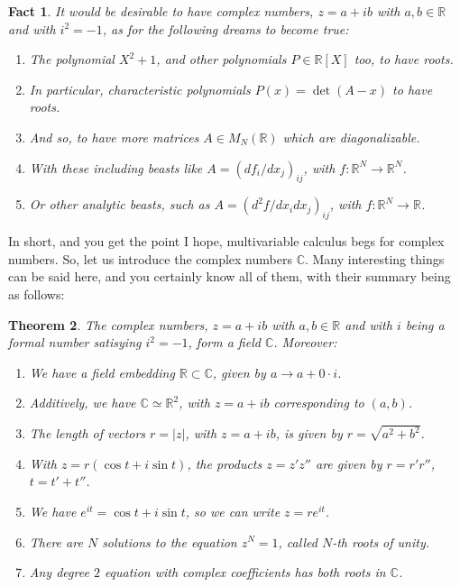 \documentclass[12pt]{amsbook}
\newtheorem{theorem}{Theorem}[chapter]
\newtheorem{fact}[theorem]{Fact}
\begin{document}
\begin{fact}
It would be desirable to have complex numbers, $z=a+ib$ with $a,b\in\mathbb R$ and with $i^2=-1$, as for the following dreams to become true:
\begin{enumerate}
\item The polynomial $X^2+1$, and other polynomials $P\in\mathbb R[X]$ too, to have roots.

\item In particular, characteristic polynomials $P(x)=\det(A-x)$ to have roots.

\item And so, to have more matrices $A\in M_N(\mathbb R)$ which are diagonalizable.

\item With these including beasts like $A=(df_i/dx_j)_{ij}$, with $f:\mathbb R^N\to\mathbb R^N$.

\item Or other analytic beasts, such as $A=(d^2f/dx_idx_j)_{ij}$, with $f:\mathbb R^N\to\mathbb R$.
\end{enumerate}
\end{fact}

In short, and you get the point I hope, multivariable calculus begs for complex numbers. So, let us introduce the complex numbers $\mathbb C$. Many interesting things can be said here, and you certainly know all of them, with their summary being as follows:


\begin{theorem}
The complex numbers, $z=a+ib$ with $a,b\in\mathbb R$ and with $i$ being a formal number satisying $i^2=-1$, form a field $\mathbb C$. Moreover:
\begin{enumerate}
\item We have a field embedding $\mathbb R\subset\mathbb C$, given by $a\to a+0\cdot i$.

\item Additively, we have $\mathbb C\simeq\mathbb R^2$, with $z=a+ib$ corresponding to $(a,b)$.

\item The length of vectors $r=|z|$, with $z=a+ib$, is given by $r=\sqrt{a^2+b^2}$.

\item With $z=r(\cos t+i\sin t)$, the products $z=z'z''$ are given by $r=r'r''$, $t=t'+t''$.

\item We have $e^{it}=\cos t+i\sin t$, so we can write $z=re^{it}$.

\item There are $N$ solutions to the equation $z^N=1$, called $N$-th roots of unity.

\item Any degree $2$ equation with complex coefficients has both roots in $\mathbb C$.
\end{enumerate}
\end{theorem}
\end{document}
